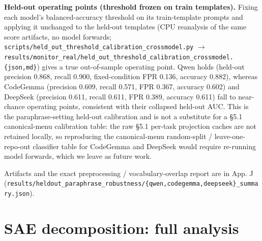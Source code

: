 \documentclass[
  11pt,
  a4paper]{article}
\begin{document}
\textbf{Held-out operating points (threshold frozen on train
templates).} Fixing each model's balanced-accuracy threshold on its
train-template prompts and applying it unchanged to the held-out
templates (CPU reanalysis of the same score artifacts, no model
forwards;
\texttt{scripts/held\_out\_threshold\_calibration\_crossmodel.py} \ensuremath{\rightarrow}
\texttt{results/monitor\_real/held\_out\_threshold\_calibration\_crossmodel.\{json,md\}})
gives a true out-of-sample operating point. Qwen holds (held-out
precision 0.868, recall 0.900, fixed-condition FPR 0.136, accuracy
0.882), whereas CodeGemma (precision 0.609, recall 0.571, FPR 0.367,
accuracy 0.602) and DeepSeek (precision 0.611, recall 0.611, FPR 0.389,
accuracy 0.611) fall to near-chance operating points, consistent with
their collapsed held-out AUC. This is the paraphrase-setting held-out
calibration and is not a substitute for a \S{}5.1 canonical-menu
calibration table: the raw \S{}5.1 per-task projection caches are not
retained locally, so reproducing the canonical-menu random-split /
leave-one-repo-out classifier table for CodeGemma and DeepSeek would
require re-running model forwards, which we leave as future work.

Artifacts and the exact preprocessing / vocabulary-overlap report are in
App. J
(\texttt{results/heldout\_paraphrase\_robustness/\{qwen,codegemma,deepseek\}\_summary.json}).

\section{SAE decomposition: full
analysis}\label{sae-decomposition-full-analysis}
\end{document}
